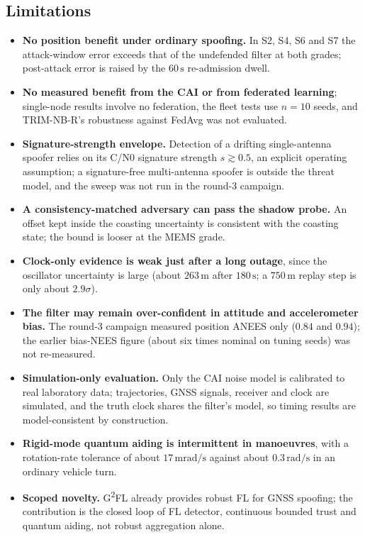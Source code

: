 \documentclass[12pt,a4paper]{article}
\begin{document}
\subsection{Limitations}
\begin{itemize}
\item \textbf{No position benefit under ordinary spoofing.} In S2, S4, S6 and S7 the attack-window error exceeds that of the undefended filter at both grades; post-attack error is raised by the $60\,\mathrm{s}$ re-admission dwell.
\item \textbf{No measured benefit from the CAI or from federated learning}; single-node results involve no federation, the fleet tests use $n=10$ seeds, and TRIM-NB-R's robustness against FedAvg was not evaluated.
\item \textbf{Signature-strength envelope.} Detection of a drifting single-antenna spoofer relies on its C/N0 signature strength $s\gtrsim0.5$, an explicit operating assumption; a signature-free multi-antenna spoofer is outside the threat model, and the sweep was not run in the round-3 campaign.
\item \textbf{A consistency-matched adversary can pass the shadow probe.} An offset kept inside the coasting uncertainty is consistent with the coasting state; the bound is looser at the MEMS grade.
\item \textbf{Clock-only evidence is weak just after a long outage}, since the oscillator uncertainty is large (about $263\,\mathrm{m}$ after $180\,\mathrm{s}$; a $750\,\mathrm{m}$ replay step is only about $2.9\sigma$).
\item \textbf{The filter may remain over-confident in attitude and accelerometer bias.} The round-3 campaign measured position ANEES only ($0.84$ and $0.94$); the earlier bias-NEES figure (about six times nominal on tuning seeds) was not re-measured.
\item \textbf{Simulation-only evaluation.} Only the CAI noise model is calibrated to real laboratory data; trajectories, GNSS signals, receiver and clock are simulated, and the truth clock shares the filter's model, so timing results are model-consistent by construction.
\item \textbf{Rigid-mode quantum aiding is intermittent in manoeuvres}, with a rotation-rate tolerance of about $17\,\mathrm{mrad/s}$ against about $0.3\,\mathrm{rad/s}$ in an ordinary vehicle turn.
\item \textbf{Scoped novelty.} G\textsuperscript{2}FL \cite{liu2026g2fl} already provides robust FL for GNSS spoofing; the contribution is the closed loop of FL detector, continuous bounded trust and quantum aiding, not robust aggregation alone.
\end{itemize}
\end{document}
